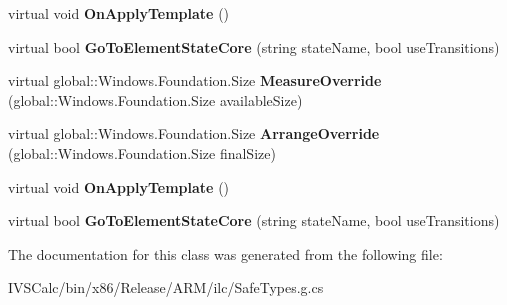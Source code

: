 \begin{DoxyCompactItemize}
\mbox{\label{class_windows_1_1_u_i_1_1_xaml_1_1_framework_element_a176a704e93c067d7a68890b4560a974a}} 
virtual void {\bfseries On\+Apply\+Template} ()
\item 
\mbox{\label{class_windows_1_1_u_i_1_1_xaml_1_1_framework_element_ab28bfbcd2ce35b9f1d361c4b523e169b}} 
virtual bool {\bfseries Go\+To\+Element\+State\+Core} (string state\+Name, bool use\+Transitions)
\item 
\mbox{\label{class_windows_1_1_u_i_1_1_xaml_1_1_framework_element_af7bed5025864082e11a8690534124dd6}} 
virtual global\+::\+Windows.\+Foundation.\+Size {\bfseries Measure\+Override} (global\+::\+Windows.\+Foundation.\+Size available\+Size)
\item 
\mbox{\label{class_windows_1_1_u_i_1_1_xaml_1_1_framework_element_ae01b5ef9f4d89b138b02e23be40b1a6d}} 
virtual global\+::\+Windows.\+Foundation.\+Size {\bfseries Arrange\+Override} (global\+::\+Windows.\+Foundation.\+Size final\+Size)
\item 
\mbox{\label{class_windows_1_1_u_i_1_1_xaml_1_1_framework_element_a176a704e93c067d7a68890b4560a974a}} 
virtual void {\bfseries On\+Apply\+Template} ()
\item 
\mbox{\label{class_windows_1_1_u_i_1_1_xaml_1_1_framework_element_ab28bfbcd2ce35b9f1d361c4b523e169b}} 
virtual bool {\bfseries Go\+To\+Element\+State\+Core} (string state\+Name, bool use\+Transitions)
\end{DoxyCompactItemize}


The documentation for this class was generated from the following file\+:\begin{DoxyCompactItemize}
\item 
I\+V\+S\+Calc/bin/x86/\+Release/\+A\+R\+M/ilc/Safe\+Types.\+g.\+cs\end{DoxyCompactItemize}
